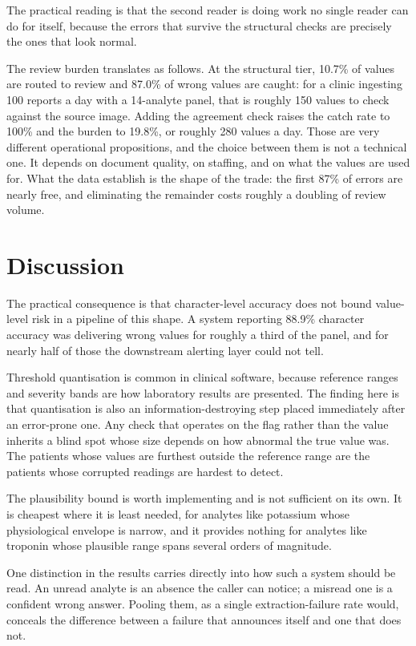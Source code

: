 \documentclass[11pt]{article}
\begin{document}
The practical reading is that the second reader is doing work no single reader can do for
itself, because the errors that survive the structural checks are precisely the ones that look
normal.

The review burden translates as follows. At the structural tier, 10.7\% of
values are routed to review and 87.0\% of wrong values are caught: for a clinic ingesting 100
reports a day with a 14-analyte panel, that is roughly 150 values to check against the source
image. Adding the agreement check raises the catch rate to 100\% and the burden to 19.8\%, or
roughly 280 values a day. Those are very different operational propositions, and the choice
between them is not a technical one. It depends on document quality, on staffing, and on what
the values are used for. What the data establish is the shape of the trade: the first 87\% of
errors are nearly free, and eliminating the remainder costs roughly a doubling of review
volume.

\section{Discussion}

The practical consequence is that character-level accuracy does not bound value-level risk in a
pipeline of this shape. A system reporting 88.9\% character accuracy was delivering
wrong values for roughly a third of the panel, and for nearly half of those the downstream
alerting layer could not tell.

Threshold quantisation is common in clinical software, because reference ranges and severity
bands are how laboratory results are presented. The finding here is that quantisation is also an
information-destroying step placed immediately after an error-prone one. Any check that operates
on the flag rather than the value inherits a blind spot whose size depends on how abnormal the
true value was. The patients whose values are furthest outside the reference range are the
patients whose corrupted readings are hardest to detect.

The plausibility bound is worth implementing and is not sufficient on its own. It is cheapest
where it is least needed, for analytes like potassium whose physiological envelope is narrow,
and it provides nothing for analytes like troponin whose plausible range spans several orders of
magnitude.

One distinction in the results carries directly into how such a system should be read. An
unread analyte is an absence the caller can notice; a misread one is a confident wrong answer.
Pooling them, as a single extraction-failure rate would, conceals the difference between a
failure that announces itself and one that does not.
\end{document}
